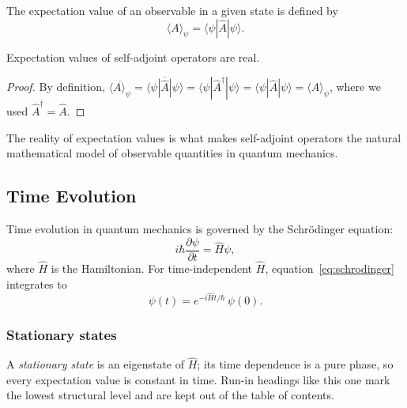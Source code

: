 \documentclass[a4paper,11pt]{article}
\begin{document}
The expectation value of an observable in a given state is defined by
\begin{equation}
  \langle A \rangle_\psi
  = \langle \psi | \hat{A} | \psi \rangle .
  \label{eq:expectation}
\end{equation}

\begin{mainresult}
\begin{theorem}
  Expectation values of self-adjoint operators are real.
\end{theorem}
\end{mainresult}

\begin{proof}
  By definition, $\overline{\langle A \rangle_\psi}
  = \overline{\langle \psi | \hat{A} | \psi \rangle}
  = \langle \psi | \hat{A}^\dagger | \psi \rangle
  = \langle \psi | \hat{A} | \psi \rangle
  = \langle A \rangle_\psi$, where we used $\hat{A}^\dagger = \hat{A}$.
\end{proof}

\begin{remark}
  The reality of expectation values is what makes self-adjoint operators the natural mathematical model of observable quantities in quantum mechanics.
\end{remark}

\subsection{Time Evolution}

Time evolution in quantum mechanics is governed by the Schr\"odinger equation:
\begin{equation}
  i\hbar \frac{\partial \psi}{\partial t}
  = \hat{H}\psi ,
  \label{eq:schrodinger}
\end{equation}
where $\hat{H}$ is the Hamiltonian. For time-independent $\hat{H}$, equation~\eqref{eq:schrodinger} integrates to
\begin{equation}
  \psi(t) = e^{-i\hat{H}t/\hbar}\,\psi(0).
\end{equation}

\subsubsection{Stationary states}
A \emph{stationary state} is an eigenstate of $\hat{H}$; its time dependence is a pure phase, so every expectation value is constant in time. Run-in headings like this one mark the lowest structural level and are kept out of the table of contents.
\end{document}
